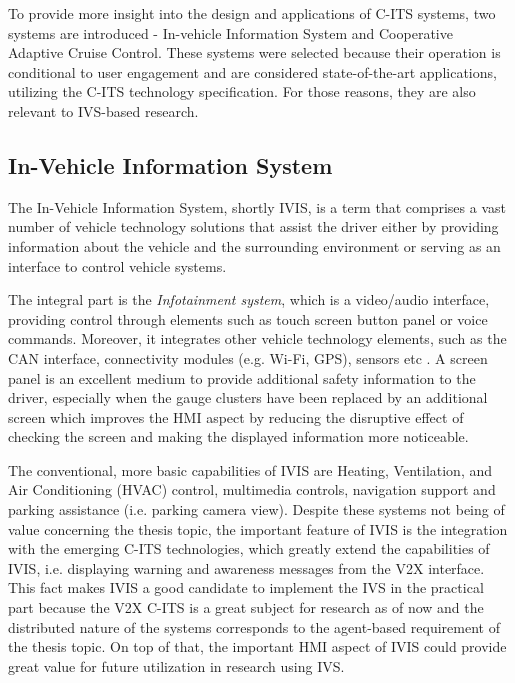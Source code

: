 \documentclass[main.tex]{subfiles}
\begin{document}
To provide more insight into the design and applications of C-ITS systems, two systems are 
introduced - In-vehicle Information System and Cooperative Adaptive Cruise Control. These 
systems were selected because their operation is conditional to user engagement and are 
considered state-of-the-art applications, utilizing the C-ITS technology specification. For 
those reasons, they are also relevant to IVS-based research. 

\subsection{In-Vehicle Information System}

The In-Vehicle Information System, shortly IVIS, is a term that comprises a vast number of vehicle technology 
solutions that assist the driver either by providing information about the vehicle and the surrounding environment 
or serving as an interface to control vehicle systems. 

The integral part is the \emph{Infotainment system}, which is a
video/audio interface, providing control through elements such as touch screen button panel or
voice commands.  Moreover, it integrates other vehicle technology elements, such as the CAN
interface, connectivity modules (e.g. Wi-Fi, GPS), sensors etc \cite{Saxena}. A screen panel is
an excellent medium to provide additional safety information to the driver, especially when the
gauge clusters have been replaced by an additional screen which improves the HMI aspect by
reducing the disruptive effect of checking the screen and making the displayed information more
noticeable. 

The conventional, more basic capabilities of IVIS are Heating, Ventilation, and Air
Conditioning (HVAC) control, multimedia controls, navigation support and parking assistance
(i.e. parking camera view). Despite these systems not being of value concerning
the thesis topic, the important feature of IVIS is the integration with the emerging C-ITS
technologies, which greatly extend the capabilities of IVIS, i.e. displaying warning and
awareness messages from the V2X interface.  This fact makes IVIS a good candidate to implement
the IVS in the practical part because the V2X C-ITS is a great subject for research as of
now and the distributed nature of the systems corresponds to the agent-based requirement of the
thesis topic. On top of that, the important HMI aspect of IVIS could provide great value for
future utilization in research using IVS. 
\end{document}
